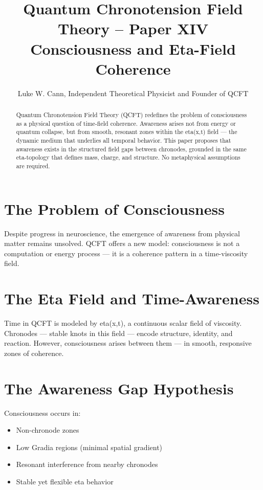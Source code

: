 \documentclass[12pt]{article}
\title{Quantum Chronotension Field Theory – Paper XIV\\Consciousness and Eta-Field Coherence}
\author{Luke W. Cann, Independent Theoretical Physicist and Founder of QCFT}
\date{}
\begin{document}
\maketitle

\begin{abstract}
Quantum Chronotension Field Theory (QCFT) redefines the problem of consciousness as a physical question of time-field coherence. Awareness arises not from energy or quantum collapse, but from smooth, resonant zones within the eta(x,t) field — the dynamic medium that underlies all temporal behavior. This paper proposes that awareness exists in the structured field gaps between chronodes, grounded in the same eta-topology that defines mass, charge, and structure. No metaphysical assumptions are required.
\end{abstract}

\section{The Problem of Consciousness}

Despite progress in neuroscience, the emergence of awareness from physical matter remains unsolved. QCFT offers a new model: consciousness is not a computation or energy process — it is a coherence pattern in a time-viscosity field.

\section{The Eta Field and Time-Awareness}

Time in QCFT is modeled by eta(x,t), a continuous scalar field of viscosity. Chronodes — stable knots in this field — encode structure, identity, and reaction. However, consciousness arises between them — in smooth, responsive zones of coherence.

\section{The Awareness Gap Hypothesis}

Consciousness occurs in:

\begin{itemize}
\item Non-chronode zones
\item Low Gradia regions (minimal spatial gradient)
\item Resonant interference from nearby chronodes
\item Stable yet flexible eta behavior
\end{itemize}
\end{document}
